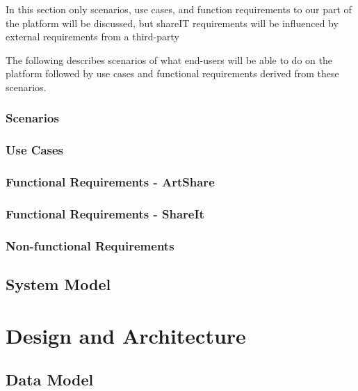 \documentclass{report}
\begin{document}
In this section only scenarios, use cases, and function requirements to our part of the platform will be discussed, but shareIT requirements will be influenced by external requirements from a third-party 

The following describes scenarios of what end-users will be able to do on the platform followed by use cases and functional requirements derived from these scenarios.


\subsection{Scenarios}


\newpage
\subsection{Use Cases}
\FloatBarrier



\FloatBarrier
\newpage \subsection{Functional Requirements - ArtShare}


\newpage \subsection{Functional Requirements - ShareIt}


\newpage \subsection{Non-functional Requirements}


\section{System Model}

\chapter{Design and Architecture}

\section{Data Model}
\end{document}
